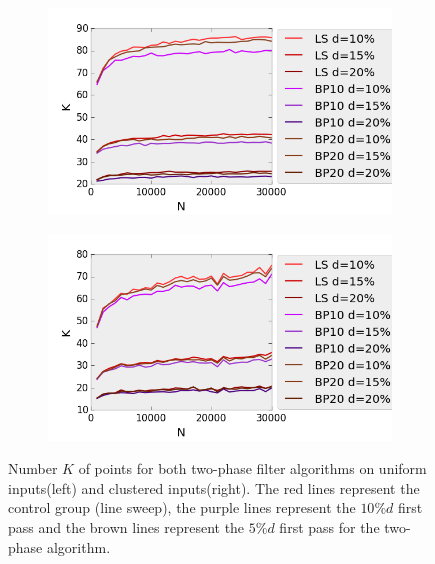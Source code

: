 \begin{figure}[H] 
  \begin{subfigure}[b]{0.5\linewidth}
    \centering
    \includegraphics[width=0.9\linewidth]{Pictures/unif_ls_bp_k} 
    \label{fig:unif_ls_bp_k} 
    \vspace{4ex}
  \end{subfigure}%
  \begin{subfigure}[b]{0.5\linewidth}
    \centering
    \includegraphics[width=0.9\linewidth]{Pictures/clus_ls_bp_k} 
    \label{fig:clus_ls_bp_k} 
    \vspace{4ex}
  \end{subfigure}
  \caption[Number $K$ of points for both two-phase filter algorithms on uniform and clustered inputs]{Number $K$ of points for both two-phase filter algorithms on uniform inputs(left) and clustered inputs(right). The red lines represent the control group (line sweep), the purple lines represent the $10\%d$ first pass and the brown lines represent the $5\%d$ first pass for the two-phase algorithm.}
  \label{fig:ls_bp_k} 
\end{figure}

